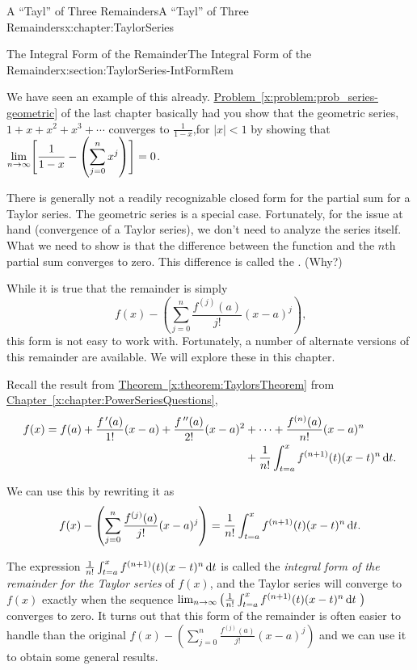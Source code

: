 \begin{chapterptx}{A ``Tayl'' of Three Remainders}{}{A ``Tayl'' of Three Remainders}{}{}{x:chapter:TaylorSeries}
\begin{sectionptx}{The Integral Form of the Remainder}{}{The Integral Form of the Remainder}{}{}{x:section:TaylorSeries-IntFormRem}
		\par
		We have seen an example of this already. \hyperref[x:problem:prob_series-geometric]{Problem~{\xreffont\ref{x:problem:prob_series-geometric}}} of the last chapter basically had you show that  the geometric series, \(1+x+x^2+x^3+\cdots\) converges to \(\frac{1}{1-x}\),for \(|x|\lt 1\) by showing that \({\displaystyle\lim_{n\rightarrow \infty}\Biggl[\frac{1}{1-x}-\left(\sum_{j=0}^nx^j\right)\Biggr]=0}\).%
		\par
		There is generally not a readily recognizable closed form for the partial sum for a Taylor series. The geometric series is a special case. Fortunately, for the issue at hand (convergence of a Taylor series), we don't need to analyze the series itself. What we need to show is that the difference between the function and the \(n\)th partial sum converges to zero. This difference is called the . (Why?)%
		\par
		While it is true that the remainder is simply%
		\begin{equation*}
			f(x)-\left(\sum_{j=0}^n\frac{f^{(j)}(a)}{j!}(x-a)^j\right)\text{,}
		\end{equation*}
		this form is not easy to work with. Fortunately, a number of alternate versions of this remainder are available. We will explore these in this chapter.%
		\par
		Recall the result from \hyperref[x:theorem:TaylorsTheorem]{Theorem~{\xreffont\ref{x:theorem:TaylorsTheorem}}} from \hyperref[x:chapter:PowerSeriesQuestions]{Chapter~{\xreffont\ref{x:chapter:PowerSeriesQuestions}}},%
		\begin{align*}
			f(x)=f(a)+\frac{f^{\,\prime}(a)}{1!}(x-a)+\frac{f^{\,\prime\prime}(a)}{2!}(x-a)^2& +\cdots+\frac{f^{(n)}(a)}{n!}(x-a)^n\\
			& +\frac{1}{n!}\int_{t=a}^xf^{(n+1)}(t)(x-t)^n\,{\rm d} t\text{.}
		\end{align*}
		\par
		We can use this by rewriting it as%
		\begin{equation*}
			f(x)-\left(\sum_{j=0}^n\frac{f^{(j)}(a)}{j!}(x-a)^j\right)=\frac{1}{n!}\int_{t=a}^xf^{(n+1)}(t)(x-t)^n\,{\rm d} t\text{.}
		\end{equation*}
		\par
		The expression \(\frac{1}{n!}\int_{t=a}^xf^{(n+1)}(t)(x-t)^n\,{\rm d} t\) is called the \emph{integral form of the remainder for the Taylor series} of \(f(x)\), and the Taylor series will converge to \(f(x)\) exactly when the sequence \(\lim_{n\rightarrow\infty}\left(\frac{1}{n!}\int_{t=a}^xf^{(n+1)}(t)(x-t)^n\,{\rm d} t\text{ } \right)\) converges to zero. It turns out that this form of the remainder is often easier to handle than the original \(f(x)-\left(\sum_{j=0}^n\frac{f^{(j)}(a)}{j!}(x-a)^j\right)\) and we can use it to obtain some general results.%

\end{sectionptx}
\end{chapterptx}
